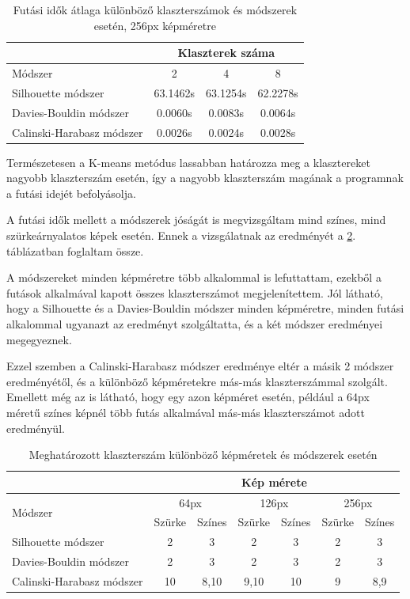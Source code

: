 \begin{table}[h]
\centering
\caption{Futási idők átlaga különböző klaszterszámok és módszerek esetén, 256px képméretre}
\label{tab:cluster_runtimes}
\medskip
\begin{tabular}{|l|c|c|c|}
\cline{2-4}
 \multicolumn{1}{c|}{} & \multicolumn{3}{c|}{Klaszterek száma} \\
 \hline
 Módszer & 2 & 4 & 8 \\
\hline
Silhouette módszer & 63.1462s & 63.1254s & 62.2278s \\
Davies-Bouldin módszer & 0.0060s & 0.0083s & 0.0064s \\
Calinski-Harabasz módszer & 0.0026s & 0.0024s & 0.0028s \\
\hline
\end{tabular}
\end{table}

Természetesen a K-means metódus lassabban határozza meg a klasztereket nagyobb klaszterszám esetén, így a nagyobb klaszterszám magának a programnak a futási idejét befolyásolja.

A futási idők mellett a módszerek jóságát is megvizsgáltam mind színes, mind szürkeárnyalatos képek esetén. Ennek a vizsgálatnak az eredményét a \ref{tab:cluster_result}. táblázatban foglaltam össze.

A módszereket minden képméretre több alkalommal is lefuttattam, ezekből a futások alkalmával kapott összes klaszterszámot megjelenítettem. Jól látható, hogy a Silhouette és a Davies-Bouldin módszer minden képméretre, minden futási alkalommal ugyanazt az eredményt szolgáltatta, és a két módszer eredményei megegyeznek.

Ezzel szemben a Calinski-Harabasz módszer eredménye eltér a másik 2 módszer eredményétől, és a különböző képméretekre más-más klaszterszámmal szolgált. Emellett még az is látható, hogy egy azon képméret esetén, például a 64px méretű színes képnél több futás alkalmával más-más klaszterszámot adott eredményül.

\begin{table}[h]
\centering
\caption{Meghatározott klaszterszám különböző képméretek és módszerek esetén}
\label{tab:cluster_result}
\medskip
\begin{tabular}{|l|c|c|c|c|c|c|}
\cline{2-7}
 \multicolumn{1}{c|}{} & \multicolumn{6}{c|}{Kép mérete} \\
 \hline
 \multirow{2}{*}{Módszer} & \multicolumn{2}{c|}{64px} & \multicolumn{2}{c|}{126px} & \multicolumn{2}{c|}{256px} \\
 \cline{2-7}
 & Szürke & Színes & Szürke & Színes & Szürke & Színes  \\
\hline
Silhouette módszer & 2 & 3 & 2 & 3 & 2 & 3 \\
Davies-Bouldin módszer & 2 & 3 & 2 & 3 & 2 & 3 \\
Calinski-Harabasz módszer & 10 & 8,10 & 9,10 & 10 & 9 & 8,9 \\
\hline
\end{tabular}
\end{table}

